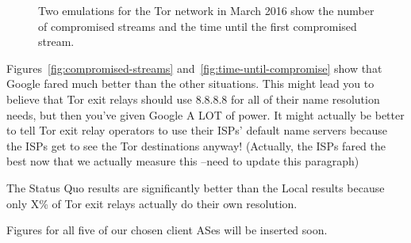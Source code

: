 \begin{figure}[t]
\centering
{}
\caption{Two emulations for the Tor network in March 2016 show the
  number of compromised streams and the time until the first compromised
  stream.} 
\label{fig:compromise-stream-time}
\end{figure}

Figures~\ref{fig:compromised-streams}
and~\ref{fig:time-until-compromise} show that
Google fared much better than the other situations. This might lead you to believe that 
Tor exit relays should use 8.8.8.8 for all of their name resolution needs, but then you've 
given Google A LOT of power. It might actually be better to tell Tor exit relay operators 
to use their ISPs' default name servers because the ISPs get to see the Tor destinations 
anyway! (Actually, the ISPs fared the best now that we actually measure this
--need to update this paragraph)

The Status Quo results are significantly better than the Local results because only X\% 
of Tor exit relays actually do their own resolution.

Figures for all five of our chosen client ASes will be inserted soon.

